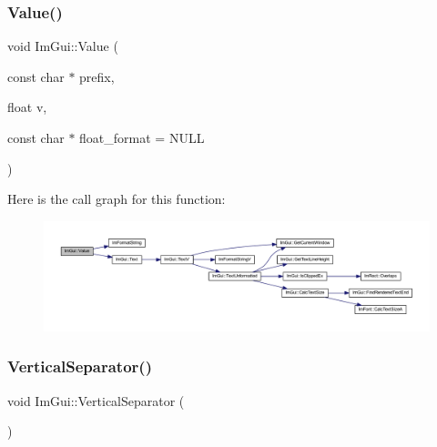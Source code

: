 \subsubsection{\texorpdfstring{Value()}{Value()}\hspace{0.1cm}{\footnotesize\ttfamily [4/4]}}
{\footnotesize\ttfamily void Im\+Gui\+::\+Value (\begin{DoxyParamCaption}\item[{const char $\ast$}]{prefix,  }\item[{float}]{v,  }\item[{const char $\ast$}]{float\+\_\+format = {\ttfamily NULL} }\end{DoxyParamCaption})}

Here is the call graph for this function\+:
\nopagebreak
\begin{figure}[H]
\begin{center}
\leavevmode
\includegraphics[width=350pt]{namespace_im_gui_a0c8b87438082a1d0a46ae2a76090ca16_cgraph}
\end{center}
\end{figure}
\mbox{\label{namespace_im_gui_ae60f7b8ece8808c477796e6594c8d796}} 
\subsubsection{\texorpdfstring{Vertical\+Separator()}{VerticalSeparator()}}
{\footnotesize\ttfamily void Im\+Gui\+::\+Vertical\+Separator (\begin{DoxyParamCaption}{ }\end{DoxyParamCaption})}

